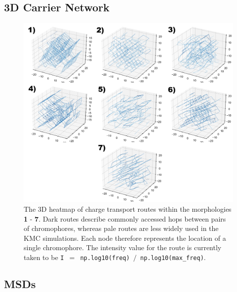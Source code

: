 \documentclass[12pt]{article}
\begin{document}
\clearpage

\subsection{3D Carrier Network}

\begin{figure}[h!]\centering
	\includegraphics[width=\textwidth]{Figures/3dHole.pdf}
    \caption{The 3D heatmap of charge transport routes within the morphologies \textbf{1} - \textbf{7}.
    Dark routes describe commonly accessed hops between pairs of chromophores, whereas pale routes are less widely used in the KMC simulations.
    Each node therefore represents the location of a single chromophore.
The intensity value for the route is currently taken to be \texttt{I $=$ np.log10(freq) $/$ np.log10(max\_freq)}.}
	\label{fig:3dNetwork}
\end{figure}

\clearpage

\subsection{MSDs}
\end{document}

